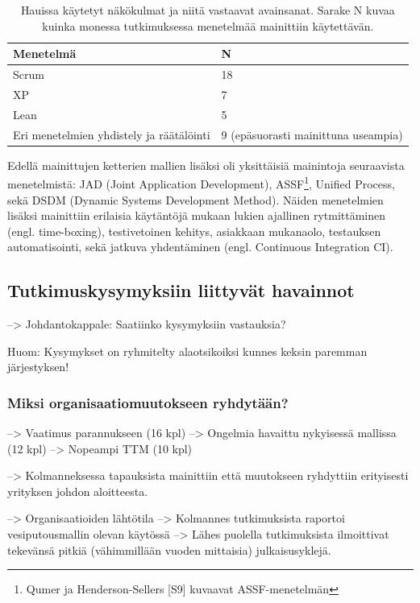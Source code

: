 \begin{table}[h]
    \begin{tabular}{|l|l|}
        \hline
        Menetelmä       & N   \\ \hline
        Scrum           & 18 \\ 
        XP              & 7 \\
        Lean            & 5 \\
        Eri menetelmien yhdistely ja räätälöinti & 9  (epäsuorasti mainittuna useampia) \\
        \hline
    \end{tabular}
	\caption{Hauissa käytetyt näkökulmat ja niitä vastaavat avainsanat. Sarake N
	kuvaa kuinka monessa tutkimuksessa menetelmää mainittiin käytettävän.}
	\label{table:practices}
\end{table}

Edellä mainittujen ketterien mallien lisäksi oli yksittäisiä mainintoja
seuraavista menetelmistä: JAD (Joint Application Development),
ASSF\footnote{Qumer ja Henderson-Sellers [S9] kuvaavat ASSF-menetelmän}, Unified Process, sekä DSDM
(Dynamic Systems Development Method). Näiden menetelmien lisäksi mainittiin
erilaisia käytäntöjä mukaan lukien ajallinen rytmittäminen (engl. time-boxing),
testivetoinen kehitys, asiakkaan mukanaolo, testauksen automatisointi, sekä
jatkuva yhdentäminen (engl. Continuous Integration CI).

\subsection{Tutkimuskysymyksiin liittyvät havainnot}

--> Johdantokappale: Saatiinko kysymyksiin vastauksia?

Huom: Kysymykset on ryhmitelty alaotsikoiksi kunnes keksin paremman järjestyksen!
 
\subsubsection{Miksi organisaatiomuutokseen ryhdytään?}

--> Vaatimus parannukseen (16 kpl)
--> Ongelmia havaittu nykyisessä mallissa (12 kpl)
--> Nopeampi TTM (10 kpl)

--> Kolmanneksessa tapauksista mainittiin että muutokseen ryhdyttiin erityisesti
yrityksen johdon aloitteesta.

--> Organisaatioiden lähtötila
--> Kolmannes tutkimuksista raportoi vesiputousmallin olevan käytössä
--> Lähes puolella tutkimuksista ilmoittivat tekevänsä pitkiä (vähimmillään
vuoden mittaisia) julkaisusyklejä.

